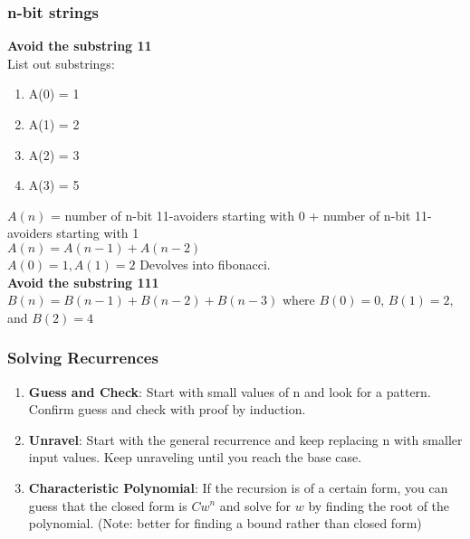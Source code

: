 \documentclass{article}
\begin{document}
\begin{spacing}{1.5}
\subsubsection{n-bit strings}
\label{sec:nstring}
\textbf{Avoid the substring 11}\\
List out substrings:
\begin{enumerate}
    \item A(0) = 1
    \item A(1) = 2
    \item A(2) = 3
    \item A(3) = 5
\end{enumerate}
$A(n)$ = number of n-bit 11-avoiders starting with 0 + number of n-bit 11-avoiders starting with 1\\
$A(n) = A(n-1) + A(n-2)$\\
$A(0) = 1, A(1) = 2$
Devolves into fibonacci.\\
\textbf{Avoid the substring 111}\\
$B(n)=B(n-1)+B(n-2)+B(n-3)$ where $B(0)=0$, $B(1)=2$, and $B(2)=4$

\subsubsection{Solving Recurrences}
\label{sec:solver}
\begin{enumerate}
    \item \textbf{Guess and Check}: Start with small values of n and look for a pattern. Confirm guess and check with proof by induction.
    \item \textbf{Unravel}: Start with the general recurrence and keep replacing n with smaller input values. Keep unraveling until you reach the base case.
    \item \textbf{Characteristic Polynomial}: If the recursion is of a certain form, you can guess that the closed form is $Cw^n$ and solve for $w$ by finding the root of the polynomial. (Note: better for finding a bound rather than closed form)
\end{enumerate}

\end{spacing}
\end{document}
